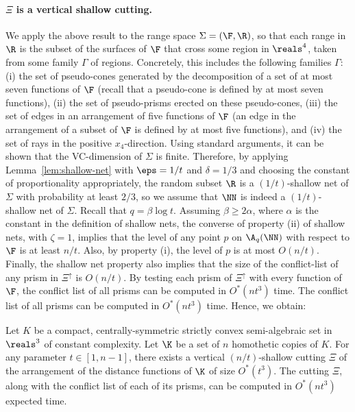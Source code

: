 \paragraph{$\Xi$ is a vertical shallow cutting.}
\fi
We apply the above result to the range space $\Sigma=(\F, \R)$, %
so that each range in $\R$ is the subset of the surfaces of $\F$ that cross some region in $\reals^4$,
taken from some family $\Gamma$ of regions. Concretely, this includes the following families $\Gamma$:
(i) the set of pseudo-cones generated by the decomposition of a set of at most seven functions of $\F$ (recall that a pseudo-cone is defined by at most seven functions), 
(ii) the set of pseudo-prisms erected on these pseudo-cones, (iii) the set of edges in an arrangement 
of five functions of $\F$ (an edge in the arrangement of a subset of $\F$ 
is defined by at most five functions),
and (iv) the set of rays in the positive $x_4$-direction.
Using standard arguments, it can be shown that the VC-dimension of $\Sigma$ is finite. Therefore, by 
applying Lemma~\ref{lem:shallow-net} with $\eps=1/t$ and $\delta=1/3$ and choosing the constant of proportionality appropriately,
the random subset $\R$ is a $(1/t)$-shallow net of $\Sigma$ with probability at least $2/3$,
so we assume that $\NN$ is indeed a $(1/t)$-shallow net of $\Sigma$.
Recall that $q=\beta\log t$. Assuming $\beta\ge 2\alpha$, where $\alpha$ is the constant in the definition of shallow nets,
the converse of property (ii) of shallow nets, with $\zeta=1$, implies 
that the level of any point 
$p$ on $\A_q(\NN)$ with respect to $\F$ is  at least $n/t$.
Also, by property (i), the level of $p$  is at most $O(n/t)$. 
Finally, the shallow net property also implies that the size of the 
conflict-list of any prism in $\Xi^\uparrow$ is $O(n/t)$.
\iffullver
By testing each prism of $\Xi^\uparrow$ with every function of $\F$, 
the conflict list of all prisms can be computed in $O^*(nt^3)$ time.
\else
The conflict list of all prisms can be computed in $O^*(nt^3)$ time.
\fi
Hence, we obtain:
%
\begin{theorem}
	\label{thm:cutting}
Let $K$ be a compact, centrally-symmetric strictly convex semi-algebraic set
in $\reals^3$ of constant complexity.  Let $\K$ be a set of $n$ homothetic 
copies of $K$. For any parameter $t \in [1,n-1]$, there exists a vertical 
$(n/t)$-shallow cutting $\Xi$ of the arrangement of the distance functions of $\K$ of size $O^*(t^3)$.
The cutting $\Xi$, along with the conflict list of each of its prisms, can be computed in $O^*(nt^3)$ expected time.
\end{theorem}
%
%
